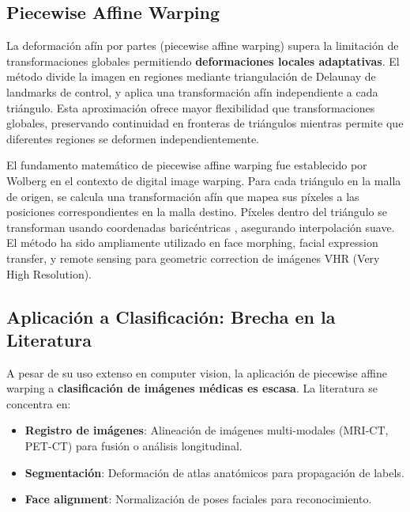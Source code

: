 \subsection{Piecewise Affine Warping}

La deformación afín por partes (piecewise affine warping) supera la limitación de transformaciones globales permitiendo \textbf{deformaciones locales adaptativas}. El método divide la imagen en regiones mediante triangulación de Delaunay de landmarks de control, y aplica una transformación afín independiente a cada triángulo. Esta aproximación ofrece mayor flexibilidad que transformaciones globales, preservando continuidad en fronteras de triángulos mientras permite que diferentes regiones se deformen independientemente.

El fundamento matemático de piecewise affine warping fue establecido por Wolberg \cite{wolberg1990digital} en el contexto de digital image warping. Para cada triángulo en la malla de origen, se calcula una transformación afín que mapea sus píxeles a las posiciones correspondientes en la malla destino. Píxeles dentro del triángulo se transforman usando coordenadas baricéntricas \cite{berg2008computational}, asegurando interpolación suave. El método ha sido ampliamente utilizado en face morphing, facial expression transfer, y remote sensing para geometric correction de imágenes VHR (Very High Resolution).



\subsection{Aplicación a Clasificación: Brecha en la Literatura}

A pesar de su uso extenso en computer vision, la aplicación de piecewise affine warping a \textbf{clasificación de imágenes médicas es escasa}. La literatura se concentra en:

\begin{itemize}
\item \textbf{Registro de imágenes}: Alineación de imágenes multi-modales (MRI-CT, PET-CT) para fusión o análisis longitudinal.
\item \textbf{Segmentación}: Deformación de atlas anatómicos para propagación de labels.
\item \textbf{Face alignment}: Normalización de poses faciales para reconocimiento.
\end{itemize}

